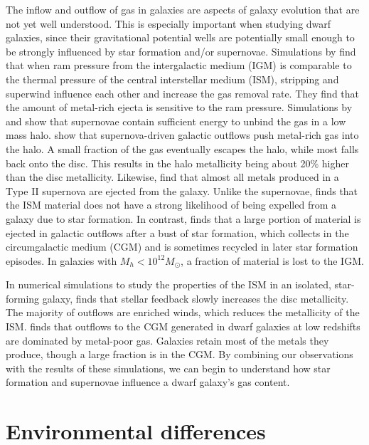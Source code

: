 The inflow and outflow of gas in galaxies are aspects of galaxy evolution that 
are not yet well understood.  This is especially important when studying dwarf 
galaxies, since their gravitational potential wells are potentially small enough 
to be strongly influenced by star formation and/or supernovae.  Simulations by 
\cite{Marcolini04} find that when ram pressure from the intergalactic medium 
(IGM) is comparable to the thermal pressure of the central interstellar medium 
(ISM), stripping and superwind influence each other and increase the gas removal 
rate.  They find that the amount of metal-rich ejecta is sensitive to the ram 
pressure.  
Simulations by \cite{Power14} and \cite{Melioli15} show that supernovae contain 
sufficient energy to unbind the gas in a low mass halo.  \cite{Hu16} show that 
supernova-driven galactic outflows push metal-rich gas into the halo.  A small 
fraction of the gas eventually escapes the halo, while most falls back onto the 
disc.  This results in the halo metallicity being about 20\% higher than the 
disc metallicity.  Likewise, \cite{Muratov17} find that almost all metals 
produced in a Type II supernova are ejected from the galaxy.
Unlike the supernovae, \cite{Melioli15} finds that the ISM material does not 
have a strong likelihood of being expelled from a galaxy due to star formation.  
In contrast, \cite{Muratov15} finds that a large portion of material is ejected 
in galactic outflows after a bust of star formation, which collects in the 
circumgalactic medium (CGM) and is sometimes recycled in later star formation 
episodes.  In galaxies with $M_h < 10^{12} M_\odot$, a fraction of material is 
lost to the IGM.

In numerical simulations to study the properties of the ISM in an isolated, 
star-forming galaxy, \cite{Hu16} finds that stellar feedback slowly increases 
the disc metallicity.  The majority of outflows are enriched winds, which 
reduces the metallicity of the ISM.  \cite{Muratov17} finds that outflows to the 
CGM generated in dwarf galaxies at low redshifts are dominated by metal-poor 
gas.  Galaxies retain most of the metals they produce, though a large fraction 
is in the CGM.  By combining our observations with the results of these 
simulations, we can begin to understand how star formation and supernovae 
influence a dwarf galaxy's gas content.


\section{Environmental differences}

